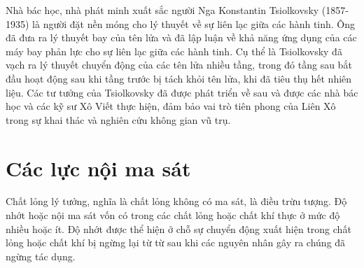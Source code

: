 Nhà bác học, nhà phát minh xuất sắc người Nga Konstantin Tsiolkovsky (1857-1935) là người đặt nền móng cho lý thuyết về sự liên lạc giữa các hành tinh. Ông đã đưa ra lý thuyết bay của tên lửa và đã lập luận về khả năng ứng dụng của các máy bay phản lực cho sự liên lạc giữa các hành tinh. Cụ thể là Tsiolkovsky đã vạch ra lý thuyết chuyển động của các tên lửa nhiều tầng, trong đó tầng sau bắt đầu hoạt động sau khi tầng trước bị tách khỏi tên lửa, khi đã tiêu thụ hết nhiên liệu. Các tư tưởng của Tsiolkovsky đã được phát triển về sau và được các nhà bác học và các kỹ sư Xô Viết thực hiện, đảm bảo vai trò tiên phong của Liên Xô trong sự khai thác và nghiên cứu không gian vũ trụ.


\section{Các lực nội ma sát}\label{sec:9_4}


Chất lỏng lý tưởng, nghĩa là chất lỏng không có ma sát, là điều trừu tượng. Độ nhớt hoặc nội ma sát vốn có trong các chất lỏng hoặc chất khí thực ở mức độ nhiều hoặc ít. Độ nhớt được thể hiện ở chỗ sự chuyển động xuất hiện trong chất lỏng hoặc chất khí bị ngừng lại từ từ sau khi các nguyên nhân gây ra chúng đã ngừng tác dụng.


